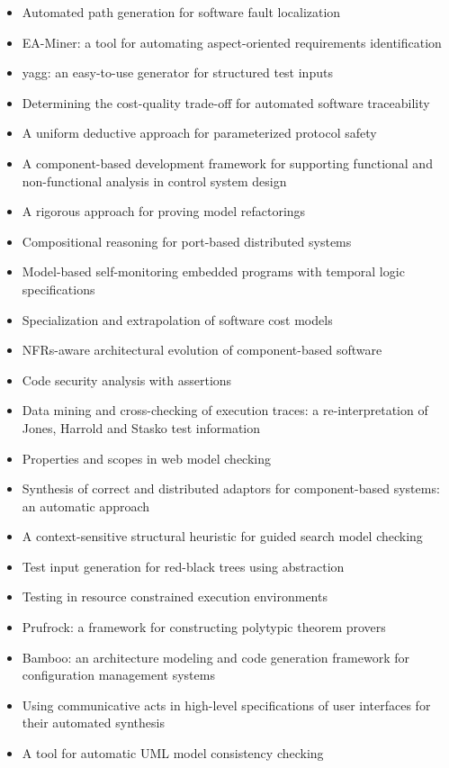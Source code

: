 {\begin{itemize}[itemsep=-1ex]
  \item Automated path generation for software fault localization
  \item EA-Miner: a tool for automating aspect-oriented requirements identification
  \item yagg: an easy-to-use generator for structured test inputs
  \item Determining the cost-quality trade-off for automated software traceability
  \item A uniform deductive approach for parameterized protocol safety
  \item A component-based development framework for supporting functional and non-functional analysis in control system design
  \item A rigorous approach for proving model refactorings
  \item Compositional reasoning for port-based distributed systems
  \item Model-based self-monitoring embedded programs with temporal logic specifications
  \item Specialization and extrapolation of software cost models
  \item NFRs-aware architectural evolution of component-based software
  \item Code security analysis with assertions
  \item Data mining and cross-checking of execution traces: a re-interpretation of Jones, Harrold and Stasko test information
  \item Properties and scopes in web model checking
  \item Synthesis of correct and distributed adaptors for component-based systems: an automatic approach
  \item A context-sensitive structural heuristic for guided search model checking
  \item Test input generation for red-black trees using abstraction
  \item Testing in resource constrained execution environments
  \item Prufrock: a framework for constructing polytypic theorem provers
  \item Bamboo: an architecture modeling and code generation framework for configuration management systems
  \item Using communicative acts in high-level specifications of user interfaces for their automated synthesis
  \item A tool for automatic UML model consistency checking

\end{itemize}}
